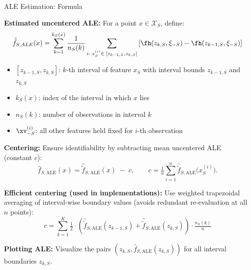 \documentclass[10pt,compress,t,notes=noshow, xcolor=table]{beamer}
\begin{document}
\begin{frame}{ALE Estimation: Formula}

\textbf{Estimated uncentered ALE:}  
For a point $x \in \mathcal{X}_S$, define:
\[
\hat{\tilde{f}}_{S, ALE}(x) = \sum_{k = 1}^{k_S(x)}\frac{1}{n_S(k)}\sum_{i: \; x_S^{(i)} \in \; [z_{k-1, S}, z_{k, S}]}\left[\fh(z_{k, S}, \xi_{-S}) -\fh(z_{k-1, S}, \xi_{-S})\right]
\]

\begin{itemize}
\tightlist
  \item $[z_{k-1, S}, z_{k,S}]$: $k$-th interval of feature $x_S$ with interval bounds $z_{k-1, S}$ and $z_{k,S}$ 
  \item $k_S(x)$: index of the interval in which $x$ lies
  \item $n_S(k)$: number of observations in interval $k$
  \item $\xv_{-S}^{(i)}$: all other features held fixed for $i$-th observation
\end{itemize}

\pause
\medskip
\textbf{Centering:}  
Ensure identifiability by subtracting mean uncentered ALE (constant $c$):
\[
\hat f_{S,\text{ALE}}(x)=
\hat{\tilde f}_{S,\text{ALE}}(x)\;-\;c,
\qquad
c=\tfrac{1}{n}\textstyle\sum_{i=1}^{n}\hat{\tilde f}_{S,\text{ALE}}\bigl(x_S^{(i)}\bigr).
\]

\textbf{Efficient centering (used in implementations):}
Use weighted trapezoidal averaging of interval-wise boundary values (avoids redundant re-evaluation at all $n$ points):
\[
c =
\textstyle\sum_{k = 1}^{K} 
\tfrac{1
}{2} \cdot \left( 
\hat{\tilde{f}}_{S, \text{ALE}}(z_{k-1,S}) +
\hat{\tilde{f}}_{S, \text{ALE}}(z_{k,S}) \right) \cdot \tfrac{n_S(k)}{n} 
\]

\textbf{Plotting ALE:} Visualize the pairs $\left( z_{k,S}, \hat{f}_{S, \text{ALE}}(z_{k,S}) \right)$ for all interval boundaries $z_{k,S}$.
\end{frame}




\end{document}

